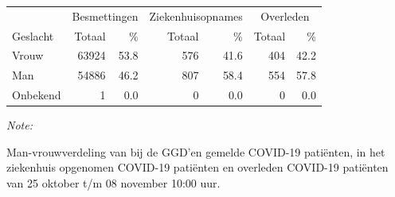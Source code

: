 \documentclass[
  english,
  man,floatsintext]{apa6}
\begin{document}
\begin{table}[H]
\centering\begingroup\fontsize{11}{13}\selectfont

\begin{threeparttable}
\begin{tabular}{lrrrrrr}
\toprule
\multicolumn{1}{c}{ } & \multicolumn{2}{c}{Besmettingen} & \multicolumn{2}{c}{Ziekenhuisopnames} & \multicolumn{2}{c}{Overleden} \\
\cmidrule(l{3pt}r{3pt}){2-3} \cmidrule(l{3pt}r{3pt}){4-5} \cmidrule(l{3pt}r{3pt}){6-7}
Geslacht & Totaal & \% & Totaal & \% & Totaal & \%\\
\midrule
Vrouw & 63924 & 53.8 & 576 & 41.6 & 404 & 42.2\\
Man & 54886 & 46.2 & 807 & 58.4 & 554 & 57.8\\
Onbekend & 1 & 0.0 & 0 & 0.0 & 0 & 0.0\\
\bottomrule
\end{tabular}
\begin{tablenotes}
\item \textit{Note: } 
\item Man-vrouwverdeling van bij de GGD’en gemelde COVID-19 patiënten, in het ziekenhuis opgenomen COVID-19 patiënten en overleden COVID-19 patiënten van 25 oktober t/m 08 november 10:00 uur.
\end{tablenotes}
\end{threeparttable}
\endgroup{}
\end{table}
\newpage
\end{document}
